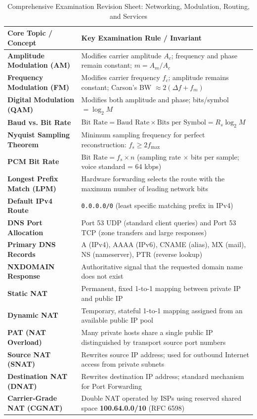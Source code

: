 \begin{table}[htbp]
\centering
\caption{Comprehensive Examination Revision Sheet: Networking, Modulation, Routing, and Services}
\label{tab:master_exam_revision_sheet}
\begin{tabularx}{\textwidth}{p{4.2cm} X}
\toprule
\textbf{Core Topic / Concept} & \textbf{Key Examination Rule / Invariant} \\
\midrule
\textbf{Amplitude Modulation (AM)} & Modifies carrier amplitude $A_c$; frequency and phase remain constant; $m = A_m / A_c$ \\
\textbf{Frequency Modulation (FM)} & Modifies carrier frequency $f_c$; amplitude remains constant; Carson's BW $\approx 2(\Delta f + f_m)$ \\
\textbf{Digital Modulation (QAM)} & Modifies both amplitude and phase; bits/symbol $= \log_2 M$ \\
\textbf{Baud vs. Bit Rate} & $\text{Bit Rate} = \text{Baud Rate} \times \text{Bits per Symbol} = R_s \log_2 M$ \\
\textbf{Nyquist Sampling Theorem} & Minimum sampling frequency for perfect reconstruction: $f_s \ge 2 f_{\max}$ \\
\textbf{PCM Bit Rate} & $\text{Bit Rate} = f_s \times n$ (sampling rate $\times$ bits per sample; voice standard = 64 kbps) \\
\textbf{Longest Prefix Match (LPM)} & Hardware forwarding selects the route with the maximum number of leading network bits \\
\textbf{Default IPv4 Route} & \texttt{0.0.0.0/0} (least specific matching prefix in IPv4) \\
\textbf{DNS Port Allocation} & Port 53 UDP (standard client queries) and Port 53 TCP (zone transfers and large responses) \\
\textbf{Primary DNS Records} & A (IPv4), AAAA (IPv6), CNAME (alias), MX (mail), NS (nameserver), PTR (reverse lookup) \\
\textbf{NXDOMAIN Response} & Authoritative signal that the requested domain name does not exist \\
\textbf{Static NAT} & Permanent, fixed 1-to-1 mapping between private IP and public IP \\
\textbf{Dynamic NAT} & Temporary, stateful 1-to-1 mapping assigned from an available public IP pool \\
\textbf{PAT (NAT Overload)} & Many private hosts share a single public IP distinguished by transport source port numbers \\
\textbf{Source NAT (SNAT)} & Rewrites source IP address; used for outbound Internet access from private subnets \\
\textbf{Destination NAT (DNAT)} & Rewrites destination IP address; standard mechanism for Port Forwarding \\
\textbf{Carrier-Grade NAT (CGNAT)} & Double NAT operated by ISPs using reserved shared space \textbf{100.64.0.0/10} (RFC 6598) \\
\bottomrule
\end{tabularx}
\end{table}

